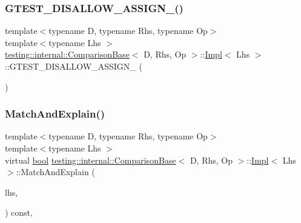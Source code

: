 \subsubsection{\texorpdfstring{G\+T\+E\+S\+T\+\_\+\+D\+I\+S\+A\+L\+L\+O\+W\+\_\+\+A\+S\+S\+I\+G\+N\+\_\+()}{GTEST\_DISALLOW\_ASSIGN\_()}}
{\footnotesize\ttfamily template$<$typename D, typename Rhs, typename Op$>$ \\
template$<$typename Lhs $>$ \\
\hyperlink{classtesting_1_1internal_1_1ComparisonBase}{testing\+::internal\+::\+Comparison\+Base}$<$ D, Rhs, Op $>$\+::\hyperlink{classtesting_1_1internal_1_1ComparisonBase_1_1Impl}{Impl}$<$ Lhs $>$\+::G\+T\+E\+S\+T\+\_\+\+D\+I\+S\+A\+L\+L\+O\+W\+\_\+\+A\+S\+S\+I\+G\+N\+\_\+ (\begin{DoxyParamCaption}\item[{\hyperlink{classtesting_1_1internal_1_1ComparisonBase_1_1Impl}{Impl}$<$ Lhs $>$}]{ }\end{DoxyParamCaption})\hspace{0.3cm}{\ttfamily [private]}}

\mbox{\label{classtesting_1_1internal_1_1ComparisonBase_1_1Impl_a3d4468431bc7104b8269dedfa3a596cd}} 
\subsubsection{\texorpdfstring{Match\+And\+Explain()}{MatchAndExplain()}}
{\footnotesize\ttfamily template$<$typename D, typename Rhs, typename Op$>$ \\
template$<$typename Lhs $>$ \\
virtual \hyperlink{classbool}{bool} \hyperlink{classtesting_1_1internal_1_1ComparisonBase}{testing\+::internal\+::\+Comparison\+Base}$<$ D, Rhs, Op $>$\+::\hyperlink{classtesting_1_1internal_1_1ComparisonBase_1_1Impl}{Impl}$<$ Lhs $>$\+::Match\+And\+Explain (\begin{DoxyParamCaption}\item[{Lhs}]{lhs,  }\item[{\hyperlink{classtesting_1_1MatchResultListener}{Match\+Result\+Listener} $\ast$}]{ }\end{DoxyParamCaption}) const\hspace{0.3cm}{\ttfamily [inline]}, {\ttfamily [virtual]}}



